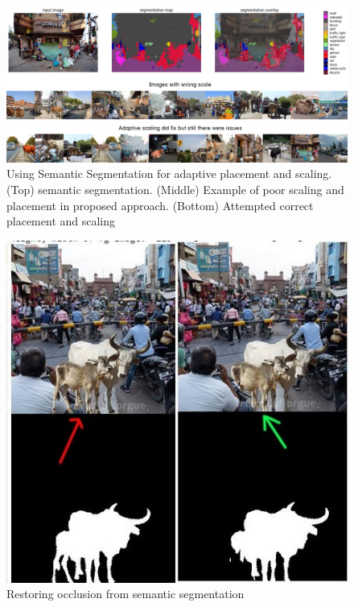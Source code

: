 \documentclass[review]{cvpr}
\begin{document}
\begin{figure}
  \begin{center}
  \includegraphics[width=1.0\textwidth]{refinement.png}
  \caption{Using Semantic Segmentation for adaptive placement and scaling. (Top) semantic segmentation. (Middle) Example of poor scaling and placement in proposed approach. (Bottom) Attempted correct placement and scaling}
  
  \end{center}
  \label{fig:refinement}
\end{figure}

\begin{figure}
  \begin{center}
  \includegraphics[width=1.0\linewidth]{occlusion.jpg}
  \caption{Restoring occlusion from semantic segmentation}
  \end{center}
  \label{fig:occlusion}
\end{figure}
\end{document}

